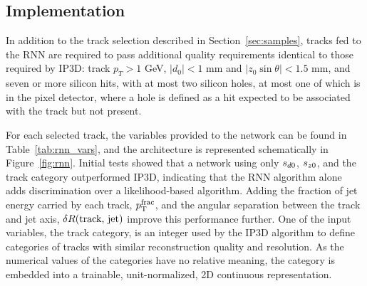 
\subsection{Implementation}


In addition to the track selection described in Section~\ref{sec:samples}, tracks fed to the RNN are required to pass additional quality requirements identical to those required by IP3D: track $p_{T} > 1$ GeV, $| d_0 | <1$ mm and $| z_0 \sin \theta | <1.5$ mm, and seven or more silicon hits, with at most two silicon holes, at most one of which is in the pixel detector,
where a hole is defined as a hit expected to be associated with the track but not present.

For each selected track, the variables provided to the network can be found in Table~\ref{tab:rnn_vars}, and the architecture is represented schematically in Figure~\ref{fig:rnn}.
Initial tests showed that a network using only $s_{d0}$, $s_{z0}$, and the track category outperformed IP3D, indicating that the RNN algorithm alone adds discrimination over a likelihood-based algorithm.
Adding the fraction of jet energy carried by each track, $p_{\rm T}^{\rm frac}$, and the angular separation between the track and jet axis, $\delta R(\text{track, jet})$ improve this performance further.
One of the input variables, the track category, is an integer used by the IP3D algorithm to define categories of tracks with similar reconstruction quality and resolution.  As the numerical values of the categories have no relative meaning, the category is embedded into a trainable, unit-normalized, 2D continuous representation.

